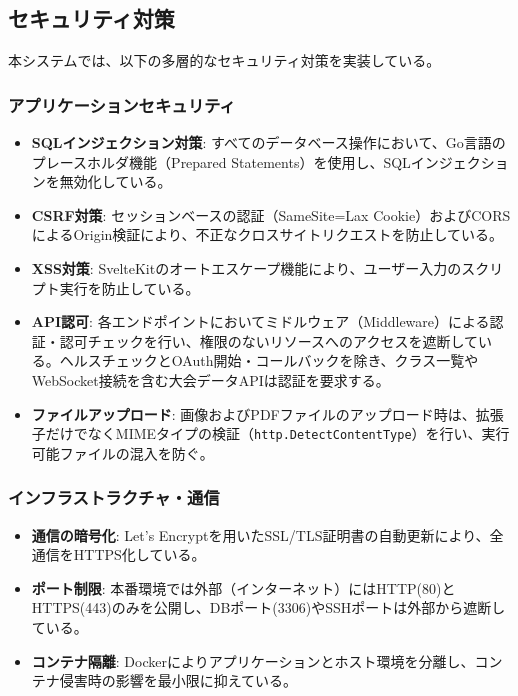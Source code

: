 \documentclass[paper=a4, fontsize=11pt]{jlreq}
\begin{document}
\subsection{セキュリティ対策}
本システムでは、以下の多層的なセキュリティ対策を実装している。

\subsubsection{アプリケーションセキュリティ}
\begin{itemize}
    \item \textbf{SQLインジェクション対策}: すべてのデータベース操作において、Go言語のプレースホルダ機能（Prepared Statements）を使用し、SQLインジェクションを無効化している。
    \item \textbf{CSRF対策}: セッションベースの認証（SameSite=Lax Cookie）およびCORSによるOrigin検証により、不正なクロスサイトリクエストを防止している。
    \item \textbf{XSS対策}: SvelteKitのオートエスケープ機能により、ユーザー入力のスクリプト実行を防止している。
    \item \textbf{API認可}: 各エンドポイントにおいてミドルウェア（Middleware）による認証・認可チェックを行い、権限のないリソースへのアクセスを遮断している。ヘルスチェックとOAuth開始・コールバックを除き、クラス一覧やWebSocket接続を含む大会データAPIは認証を要求する。
    \item \textbf{ファイルアップロード}: 画像およびPDFファイルのアップロード時は、拡張子だけでなくMIMEタイプの検証（\texttt{http.DetectContentType}）を行い、実行可能ファイルの混入を防ぐ。
\end{itemize}

\subsubsection{インフラストラクチャ・通信}
\begin{itemize}
    \item \textbf{通信の暗号化}: Let's Encryptを用いたSSL/TLS証明書の自動更新により、全通信をHTTPS化している。
    \item \textbf{ポート制限}: 本番環境では外部（インターネット）にはHTTP(80)とHTTPS(443)のみを公開し、DBポート(3306)やSSHポートは外部から遮断している。
    \item \textbf{コンテナ隔離}: Dockerによりアプリケーションとホスト環境を分離し、コンテナ侵害時の影響を最小限に抑えている。
\end{itemize}
\end{document}
